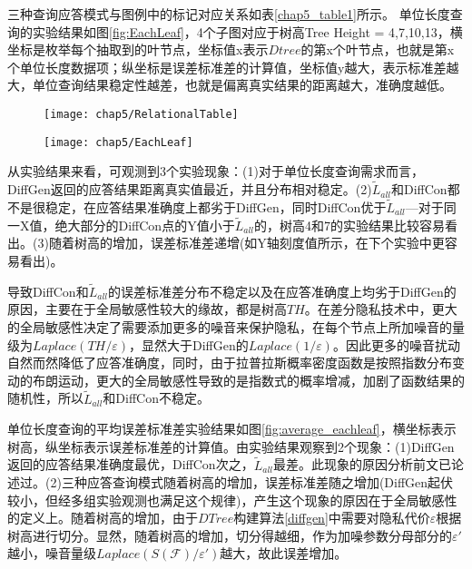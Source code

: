 三种查询应答模式与图例中的标记对应关系如表\ref{chap5_table1}所示。
单位长度查询的实验结果如图\ref{fig:EachLeaf}，4个子图对应于树高Tree Height = 4,7,10,13，横坐标是枚举每个抽取到的叶节点，坐标值x表示$Dtree$的第x个叶节点，也就是第x个单位长度数据项；纵坐标是误差标准差的计算值，坐标值y越大，表示标准差越大，单位查询结果稳定性越差，也就是偏离真实结果的距离越大，准确度越低。

\begin{figure}[!htp]
	\centering
	\texttt{[image: chap5/RelationalTable]}
\end{figure}


\begin{figure}[!htp]
	\centering
	\texttt{[image: chap5/EachLeaf]}
\end{figure}

从实验结果来看，可观测到3个实验现象：(1)对于单位长度查询需求而言，DiffGen返回的应答结果距离真实值最近，并且分布相对稳定。(2)$\tilde{L}_{all}$和DiffCon都不是很稳定，在应答结果准确度上都劣于DiffGen，同时DiffCon优于$\tilde{L}_{all}$---对于同一X值，绝大部分的DiffCon点的Y值小于$\tilde{L}_{all}$的，树高4和7的实验结果比较容易看出。(3)随着树高的增加，误差标准差递增(如Y轴刻度值所示，在下个实验中更容易看出)。

导致DiffCon和$\tilde{L}_{all}$的误差标准差分布不稳定以及在应答准确度上均劣于DiffGen的原因，主要在于全局敏感性较大的缘故，都是树高$TH$。在差分隐私技术中，更大的全局敏感性决定了需要添加更多的噪音来保护隐私，在每个节点上所加噪音的量级为$Laplace(TH/\varepsilon)$，显然大于DiffGen的$Laplace(1/\varepsilon)$。因此更多的噪音扰动自然而然降低了应答准确度，同时，由于拉普拉斯概率密度函数是按照指数分布变动的布朗运动，更大的全局敏感性导致的是指数式的概率增减，加剧了函数结果的随机性，所以$\tilde{L}_{all}$和DiffCon不稳定。

单位长度查询的平均误差标准差实验结果如图\ref{fig:average_eachleaf}，横坐标表示树高，纵坐标表示误差标准差的计算值。由实验结果观察到2个现象：(1)DiffGen返回的应答结果准确度最优，DiffCon次之，$\tilde{L}_{all}$最差。此现象的原因分析前文已论述过。(2)三种应答查询模式随着树高的增加，误差标准差随之增加(DiffGen起伏较小，但经多组实验观测也满足这个规律)，产生这个现象的原因在于全局敏感性的定义上。随着树高的增加，由于$DTree$构建算法\ref{diffgen}中需要对隐私代价$\varepsilon$根据树高进行切分。显然，随着树高的增加，切分得越细，作为加噪参数分母部分的${\varepsilon}'$越小，噪音量级$Laplace(S(\mathcal{F})/{\varepsilon}')$越大，故此误差增加。

